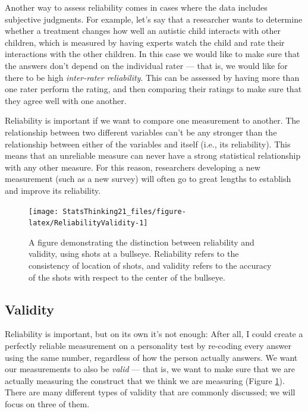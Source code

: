 \documentclass[12pt,]{book}
\theoremstyle{definition}
\theoremstyle{definition}
\theoremstyle{definition}
\theoremstyle{remark}
\begin{document}
Another way to assess reliability comes in cases where the data includes subjective judgments. For example, let's say that a researcher wants to determine whether a treatment changes how well an autistic child interacts with other children, which is measured by having experts watch the child and rate their interactions with the other children. In this case we would like to make sure that the answers don't depend on the individual rater --- that is, we would like for there to be high \emph{inter-rater reliability}. This can be assessed by having more than one rater perform the rating, and then comparing their ratings to make sure that they agree well with one another.

Reliability is important if we want to compare one measurement to another. The relationship between two different variables can't be any stronger than the relationship between either of the variables and itself (i.e., its reliability). This means that an unreliable measure can never have a strong statistical relationship with any other measure. For this reason, researchers developing a new measurement (such as a new survey) will often go to great lengths to establish and improve its reliability.

\begin{figure}
\texttt{[image: StatsThinking21\_files/figure-latex/ReliabilityValidity-1]} \caption{A figure demonstrating the distinction between reliability and validity, using shots at a bullseye. Reliability refers to the consistency of location of shots, and validity refers to the accuracy of the shots with respect to the center of the bullseye. }\label{fig:ReliabilityValidity}
\end{figure}

\hypertarget{validity}{%
\subsection{Validity}\label{validity}}

Reliability is important, but on its own it's not enough: After all, I could create a perfectly reliable measurement on a personality test by re-coding every answer using the same number, regardless of how the person actually answers. We want our measurements to also be \emph{valid} --- that is, we want to make sure that we are actually measuring the construct that we think we are measuring (Figure \ref{fig:ReliabilityValidity}). There are many different types of validity that are commonly discussed; we will focus on three of them.
\end{document}
